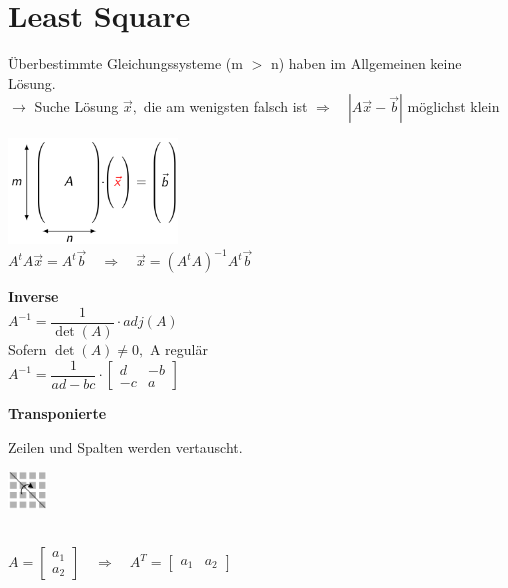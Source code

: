 	\section{Least Square }
	Überbestimmte Gleichungssysteme (m $>$ n) haben im Allgemeinen keine Lösung.\\
	$\rightarrow$ Suche Lösung $\vec{x},$ die am wenigsten	falsch ist $\Rightarrow \quad|A \vec{x}-\vec{b}|$ möglichst klein \\
	\begin{minipage}[b]{0.3\textwidth}
		\includegraphics[width=4.5cm]{./bilder/LeastSquare.png}\\
		
		$\boxed{A^{t} A \vec{x}=A^{t} \vec{b} \quad \Rightarrow \quad \vec{x}=\left(A^{t} A\right)^{-1} A^{t} \vec{b}}$
	\end{minipage}\qquad \vline \quad%
	\begin{minipage}[b]{0.3\textwidth}
		\textbf{Inverse}\\[2mm]
		$A^{-1}=\dfrac{1}{\operatorname{det}(A)} \cdot a d j(A) \quad$\\[2mm]
		Sofern $\operatorname{det}(A) \neq 0,$ A regulär\\[5mm]
		$\boxed{A^{-1}=\dfrac{1}{a d-b c} \cdot\left[\begin{array}{cc}{d} & {-b} \\ {-c} & {a}\end{array}\right]}$\\
	\end{minipage}\qquad%
	\begin{minipage}[b]{0.35\textwidth}
		\textbf{Transponierte}\\[2mm]
		\begin{minipage}{0.5\textwidth}			
			Zeilen und Spalten werden vertauscht.
		\end{minipage}%
		\begin{minipage}{0.5\textwidth}
			\quad\includegraphics[height=1cm]{./bilder/Transponierte.png}
		\end{minipage}\\[5mm]
		
		$A = \left[\begin{matrix} a_1 \\ a_2 \end{matrix}\right] \quad \Rightarrow \quad A^T = \left[\begin{matrix} a_1 & a_2 \end{matrix}\right] $
	\end{minipage}
	

